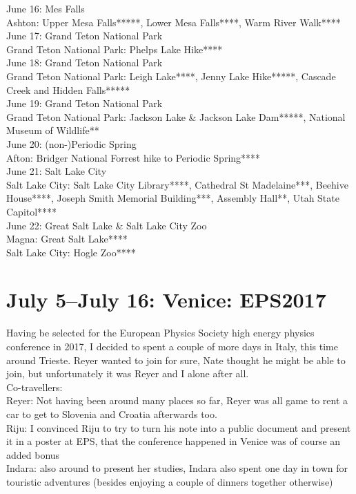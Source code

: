 June 16: Mes Falls\\
Ashton: Upper Mesa Falls*****, Lower Mesa Falls****, Warm River Walk****\\

June 17: Grand Teton National Park\\
Grand Teton National Park: Phelps Lake Hike****\\

June 18: Grand Teton National Park\\
Grand Teton National Park: Leigh Lake****, Jenny Lake Hike*****, Cascade Creek and Hidden Falls*****\\

June 19: Grand Teton National Park\\
Grand Teton National Park: Jackson Lake \& Jackson Lake Dam*****, National Museum of Wildlife**\\

June 20: (non-)Periodic Spring\\
Afton: Bridger National Forrest hike to Periodic Spring****\\

June 21: Salt Lake City\\
Salt Lake City: Salt Lake City Library****, Cathedral St Madelaine***, Beehive House****, Joseph Smith Memorial Building***, Assembly Hall**, Utah State Capitol****\\

June 22: Great Salt Lake \& Salt Lake City Zoo\\
Magna: Great Salt Lake****\\
Salt Lake City: Hogle Zoo****

\section{July 5--July 16: Venice: EPS2017}
\label{Venice2017}

Having be selected for the European Physics Society high energy physics conference in 2017, I decided to spent a couple of more days in Italy, this time around Trieste. Reyer wanted to join for sure, Nate thought he might be able to join, but unfortunately it was Reyer and I alone after all.\\

Co-travellers: \\
Reyer: Not having been around many places so far, Reyer was all game to rent a car to get to Slovenia and Croatia afterwards too.\\
Riju: I convinced Riju to try to turn his note into a public document and present it in a poster at EPS, that the conference happened in Venice was of course an added bonus\\
Indara: also around to present her studies, Indara also spent one day in town for touristic adventures (besides enjoying a couple of dinners together otherwise)\\

